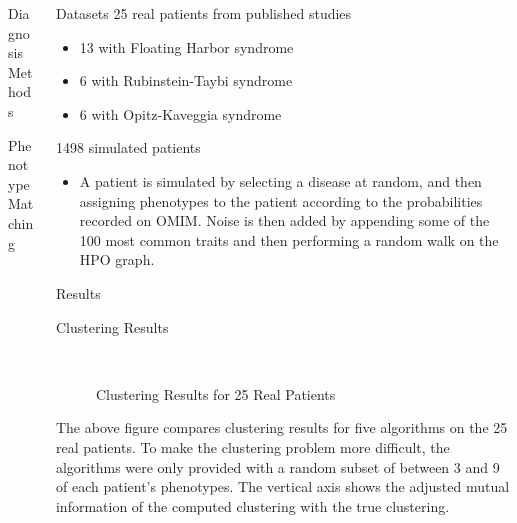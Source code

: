 \documentclass[final]{beamer} %
\begin{document}
\begin{frame}{}
\begin{columns}[T]
\begin{column}{0.3\linewidth}
\begin{block}{\Huge Diagnosis Methods}
\begin{block}{\Large Phenotype Matching}
     \end{block}
   \end{block}

 \end{column}

 \begin{column}{0.3\linewidth}
   \begin{block}{\Huge Datasets}
     \Large 25 real patients from published studies
     \begin{itemize}
     \item 13 with Floating Harbor syndrome
     \item 6 with Rubinstein-Taybi syndrome
     \item 6 with Opitz-Kaveggia syndrome
     \end{itemize}
     1498 simulated patients
     \begin{itemize}
     \item A patient is simulated by selecting a disease at random,
       and then assigning phenotypes to the patient according to the
       probabilities recorded on OMIM. Noise is then added by
       appending some of the 100 most common traits and then
       performing a random walk on the HPO graph.
     \end{itemize}
   \end{block}
   \begin{block}{\Huge Results}
     \begin{block}{\Large Clustering Results }
       \begin{figure}
         \centering
          \\
         \caption{Clustering Results for 25 Real Patients}
       \end{figure}
       \large The above figure compares clustering results for five
       algorithms on the 25 real patients. To make the clustering
       problem more difficult, the algorithms were only provided with
       a random subset of between 3 and 9 of each patient's
       phenotypes. The vertical axis shows the adjusted mutual
       information of the computed clustering with the true
       clustering.


\end{block}
\end{block}
\end{column}
\end{columns}
\end{frame}
\end{document}
